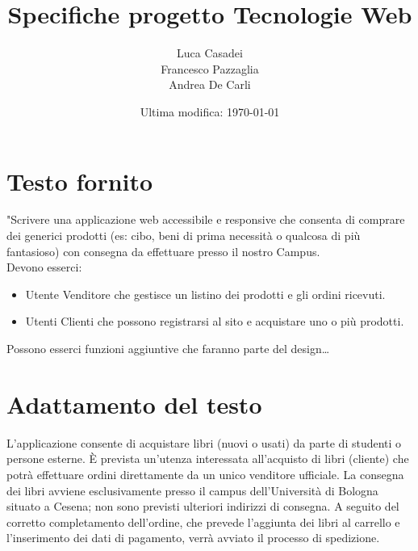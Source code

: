 \documentclass[a4paper]{article}
\author{Luca Casadei\\Francesco Pazzaglia\\Andrea De Carli}
\date{Ultima modifica: \today}
\title{\textbf{Specifiche progetto Tecnologie Web}}
\begin{document}
	\maketitle
	\tableofcontents
	\printnoidxglossaries
	\section{Testo fornito}
	"Scrivere una applicazione web accessibile e responsive che consenta di comprare dei generici prodotti (es:	cibo, beni di prima necessità o qualcosa di più fantasioso) con consegna da effettuare presso il nostro Campus.\\
	Devono esserci:
	\begin{itemize}
		\item Utente Venditore che gestisce un listino dei prodotti e gli ordini ricevuti.
		\item Utenti Clienti che possono registrarsi al sito e acquistare uno o più prodotti.
	\end{itemize}
	Possono esserci funzioni aggiuntive che faranno parte del design\dots\quotedblbase
	\section{Adattamento del testo}
	L'applicazione consente di acquistare libri (nuovi o usati) da parte di studenti o persone esterne. È prevista un'utenza interessata all'acquisto di libri (\gls{cliente}) che potrà effettuare ordini direttamente da un unico \gls{venditore} ufficiale. La consegna dei libri avviene esclusivamente presso il \gls{campus} dell'Università di Bologna situato a Cesena; non sono previsti ulteriori indirizzi di consegna. A seguito del corretto completamento dell'ordine, che prevede l'aggiunta dei libri al carrello e l'inserimento dei dati di pagamento, verrà avviato il processo di spedizione.
\end{document}
